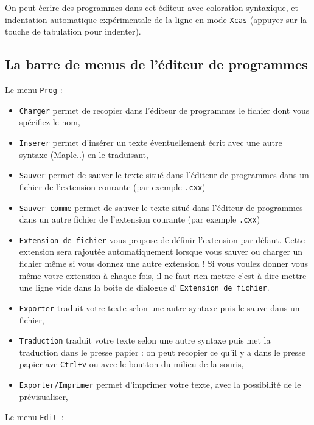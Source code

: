 \documentclass[a4paper,11pt]{article}
\begin{document}
On peut \'ecrire des programmes dans cet \'editeur avec coloration
syntaxique, et indentation automatique exp\'erimentale de la ligne en 
mode {\tt Xcas} (appuyer sur la touche de tabulation pour indenter). 

\subsection{La barre de menus de l'\'editeur de programmes}
Le menu {\tt Prog} :
\begin{itemize}
\item {\tt Charger} permet de recopier dans l'\'editeur de programmes le 
fichier dont vous sp\'ecifiez le nom,
\item {\tt Inserer} permet d'ins\'erer un texte \'eventuellement
\'ecrit avec une autre syntaxe (Maple..) en le traduisant,
\item {\tt Sauver} permet de sauver le texte situ\'e dans l'\'editeur de 
programmes dans un fichier de l'extension courante (par exemple {\tt .cxx})
\item {\tt Sauver comme} permet de sauver le texte situ\'e dans l'\'editeur de 
programmes dans un autre fichier de l'extension courante (par exemple 
{\tt .cxx})
\item {\tt Extension de fichier} vous propose de d\'efinir l'extension 
par d\'efaut. Cette extension sera rajout\'ee automatiquement lorsque vous 
sauver ou charger un fichier m\^eme si vous donnez une autre extension !
Si vous voulez donner vous m\^eme votre extension \`a chaque fois, 
il ne faut rien mettre c'est
\`a dire mettre une ligne vide dans la boite de dialogue d'
{\tt Extension de fichier}. 
\item {\tt Exporter} traduit votre texte selon une autre syntaxe 
puis le sauve dans un fichier,
\item {\tt Traduction} traduit votre texte selon une autre syntaxe puis met la 
traduction dans le presse papier : on peut recopier ce qu'il y a dans le presse
papier ave {\tt Ctrl+v} ou avec le boutton du milieu de la souris,
\item {\tt Exporter/Imprimer} permet d'imprimer votre texte, avec la 
possibilit\'e de le pr\'evisualiser, 
\end{itemize}
Le menu {\tt Edit}~:
\end{document}
